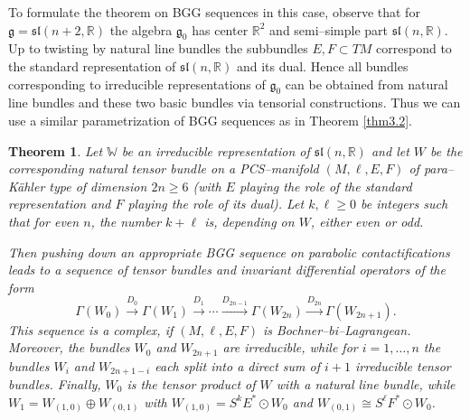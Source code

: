 \documentclass[12pt,a4paper]{amsart}
\def\frak{\mathfrak}
\def\Bbb{\mathbb}
\newcommand{\Ga}{\Gamma}
\newcounter{theorem}
\numberwithin{theorem}{section}
\newtheorem{thm}[theorem]{Theorem}
\theoremstyle{definition}
\theoremstyle{remark}
\begin{document}
To formulate the theorem on BGG sequences in this case, observe that
for $\frak g=\frak{sl}(n+2,\Bbb R)$ the algebra $\frak g_0$ has center
$\Bbb R^2$ and semi--simple part $\frak{sl}(n,\Bbb R)$. Up to twisting
by natural line bundles the subbundles $E,F\subset TM$ correspond to
the standard representation of $\frak{sl}(n,\Bbb R)$ and its
dual. Hence all bundles corresponding to irreducible representations
of $\frak g_0$ can be obtained from natural line bundles and these two
basic bundles via tensorial constructions. Thus we can use a similar
parametrization of BGG sequences as in Theorem \ref{thm3.2}.



\begin{thm}\label{thm3.3}
  Let $\Bbb W$ be an irreducible representation of $\frak{sl}(n,\Bbb
  R)$ and let $W$ be the corresponding natural tensor bundle on a
  PCS--manifold $(M,\ell,E,F)$ of para--K\"ahler type of dimension
  $2n\geq 6$ (with $E$ playing the role of the standard representation
  and $F$ playing the role of its dual). Let $k,\ell\geq 0$ be
  integers such that for even $n$, the number $k+\ell$ is, depending
  on $W$, either even or odd.

Then pushing down an appropriate BGG sequence on parabolic
contactifications leads to a sequence of tensor bundles and invariant
differential operators of the form
$$
\Ga(W_0)\overset{D_0}{\longrightarrow} \Ga(W_1)
\overset{D_1}{\longrightarrow} \cdots
\overset{D_{2n-1}}{\longrightarrow} 
\Ga(W_{2n}) \overset{D_{2n}}{\longrightarrow} 
\Ga(W_{2n+1}).
$$ This sequence is a complex, if $(M,\ell,E,F)$ is
Bochner--bi--Lagrangean. Moreover, the bundles $W_0$ and $W_{2n+1}$
are irreducible, while for $i=1,\dots,n$ the bundles $W_i$ and
$W_{2n+1-i}$ each split into a direct sum of $i+1$ irreducible tensor
bundles. Finally, $W_0$ is the tensor product of $W$ with a natural
line bundle, while $W_1=W_{(1,0)}\oplus W_{(0,1)}$ with
$W_{(1,0)}=S^kE^*\odot W_0$ and $W_{(0,1)}\cong S^\ell F^*\odot W_0$.
\end{thm}
\end{document}
